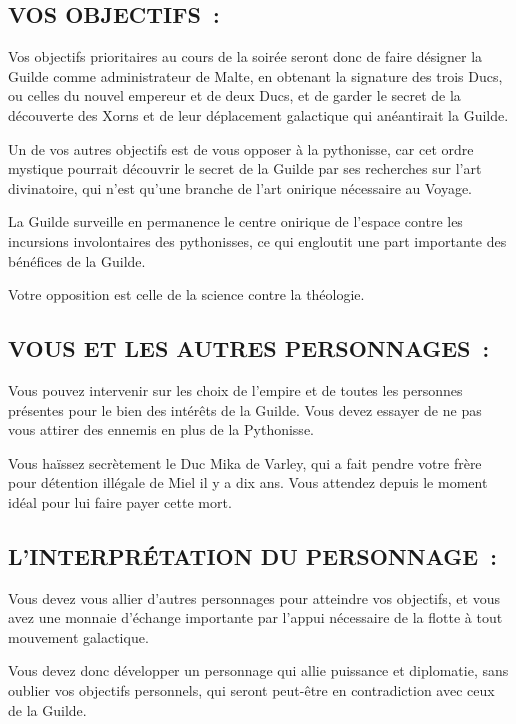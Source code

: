 \documentclass[14pt,twocolumn]{extarticle}
\begin{document}
\subsection{VOS OBJECTIFS~:}

Vos objectifs prioritaires au cours de la soirée seront donc de faire désigner
la Guilde comme administrateur de Malte, en obtenant la signature des trois
Ducs, ou celles du nouvel empereur et de deux Ducs, et de garder le secret de
la découverte des Xorns et de leur déplacement galactique qui anéantirait la
Guilde.

Un de vos autres objectifs est de vous opposer à la pythonisse, car cet ordre
mystique pourrait découvrir le secret de la Guilde par ses recherches sur l'art
divinatoire, qui n'est qu'une branche de l'art onirique nécessaire au Voyage.

La Guilde surveille en permanence le centre onirique de l'espace contre les
incursions involontaires des pythonisses, ce qui engloutit une part importante
des bénéfices de la Guilde.

Votre opposition est celle de la science contre la théologie.

\subsection{VOUS ET LES AUTRES PERSONNAGES~:}

Vous pouvez intervenir sur les choix de l'empire et de toutes les personnes
présentes pour le bien des intérêts de la Guilde. Vous devez essayer de ne pas
vous attirer des ennemis en plus de la Pythonisse.

Vous haïssez secrètement le Duc Mika de Varley, qui a fait pendre votre frère
pour détention illégale de Miel il y a dix ans. Vous attendez depuis le moment
idéal pour lui faire payer cette mort.

\subsection{L'INTERPRÉTATION DU PERSONNAGE~:}

Vous devez vous allier d'autres personnages pour atteindre vos objectifs, et
vous avez une monnaie d'échange importante par l'appui nécessaire de la flotte
à tout mouvement galactique.

Vous devez donc développer un personnage qui allie puissance et diplomatie,
sans oublier vos objectifs personnels, qui seront peut-être en contradiction
avec ceux de la Guilde.
\end{document}
